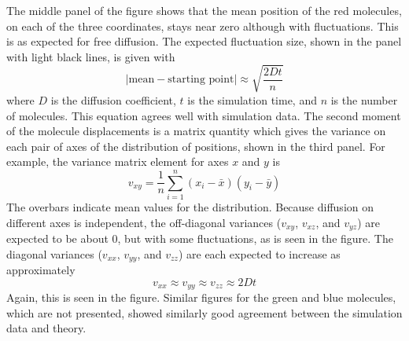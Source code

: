 \documentclass {scrbook}
\begin{document}
The middle panel of the figure shows that the mean position of the red molecules, on each of the three coordinates, stays near zero although with fluctuations. This is as expected for free diffusion. The expected fluctuation size, shown in the panel with light black lines, is given with
$$|\textrm{mean}-\textrm{starting point}| \approx \sqrt{\frac{2Dt}{n}}$$
where $D$ is the diffusion coefficient, $t$ is the simulation time, and $n$ is the number of molecules. This equation agrees well with simulation data. The second moment of the molecule displacements is a matrix quantity which gives the variance on each pair of axes of the distribution of positions, shown in the third panel. For example, the variance matrix element for axes $x$ and $y$ is
$$v_{xy} = \frac{1}{n} \sum_{i=1}^{n} (x_i - \bar{x})(y_i - \bar{y})$$
The overbars indicate mean values for the distribution. Because diffusion on different axes is independent, the off-diagonal variances ($v_{xy}$, $v_{xz}$, and $v_{yz}$) are expected to be about 0, but with some fluctuations, as is seen in the figure. The diagonal variances ($v_{xx}$, $v_{yy}$, and $v_{zz}$) are each expected to increase as approximately
$$v_{xx} \approx v_{yy} \approx v_{zz} \approx 2Dt$$
Again, this is seen in the figure. Similar figures for the green and blue molecules, which are not presented, showed similarly good agreement between the simulation data and theory.
\end{document}
